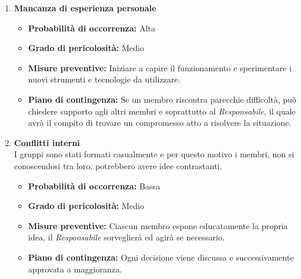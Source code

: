 \begin{enumerate}
    \item \textbf{Mancanza di esperienza personale}\\
    
    \begin{itemize}
        \item \textbf{Probabilità di occorrenza:} Alta
        \item \textbf{Grado di pericolosità:} Medio
        \item \textbf{Misure preventive:} Iniziare a capire il funzionamento e sperimentare i nuovi strumenti e tecnologie da utilizzare. 
        \item \textbf{Piano di contingenza:} Se un membro riscontra parecchie difficoltà, può chiedere supporto agli altri membri e soprattutto al \textit{Responsabile}, il quale avrà il compito di trovare un compromesso atto a risolvere la situazione.
    \end{itemize}

    \item \textbf{Conflitti interni}\\
    I gruppi sono stati formati casualmente e per questo motivo i membri, non si conoscendosi tra loro, potrebbero avere idee contrastanti.
    \begin{itemize}
        \item \textbf{Probabilità di occorrenza:} Bassa
        \item \textbf{Grado di pericolosità:} Medio
        \item \textbf{Misure preventive:} Ciascun membro espone educatamente la propria idea, il \textit{Responsabile} sorveglierà ed agirà se necessario.
        \item \textbf{Piano di contingenza:} Ogni decisione viene discussa e successivamente approvata a maggioranza.
    \end{itemize}
\end{enumerate}
